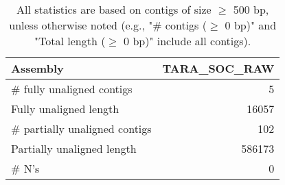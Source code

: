 \documentclass[12pt,a4paper]{article}
\begin{document}
\begin{table}[ht]
\begin{center}
\caption{All statistics are based on contigs of size $\geq$ 500 bp, unless otherwise noted (e.g., "\# contigs ($\geq$ 0 bp)" and "Total length ($\geq$ 0 bp)" include all contigs).}
\begin{tabular}{|l*{1}{|r}|}
\hline
Assembly & TARA\_SOC\_RAW \\ \hline
\# fully unaligned contigs & 5 \\ \hline
Fully unaligned length & 16057 \\ \hline
\# partially unaligned contigs & 102 \\ \hline
Partially unaligned length & 586173 \\ \hline
\# N's & 0 \\ \hline
\end{tabular}
\end{center}
\end{table}
\end{document}
